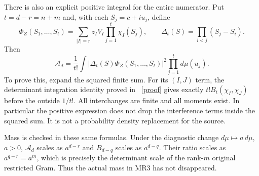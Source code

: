 \documentclass[11pt]{article}
\begin{document}
There is also an explicit positive integral for the entire numerator.
Put $t=d-r=n+m$ and, with each $S_j=c+iu_j$, define
\[
 \Phi_Z(S_1,\ldots,S_t)
    =\sum_{|I|=r}z_IV_I\prod_{j=1}^t\chi_I(S_j),
 \qquad \Delta_t(S)=\prod_{i<j}(S_j-S_i).
\]
Then
\[
 \mathcal A_d=\frac1{t!}\int
      |\Delta_t(S)\Phi_Z(S_1,\ldots,S_t)|^2
                         \prod_{j=1}^t d\mu(u_j).\tag{MR20}
\]
To prove this, expand the squared finite sum. For its $(I,J)$ term,
the determinant integration identity proved in \cite{mrroot:Mixed}%
~\href{https://github.com/KokunoYumeto/zeta-function-research-reader/blob/5992ad50c0f2a06921f1fcaded7b4e38097c0739/workbenches/splitzero-tandem/continuations/20260920-original-kernel-mixed-determinants/MIXED_CONFLUENT_PROOF.tex\#L1}{[proof]}%
{} gives
exactly $t!B_t(\chi_I,\chi_J)$ before the outside $1/t!$.
All interchanges are finite and all moments exist. In particular the
positive expression does not drop the interference terms inside the
squared sum. It is not a probability density replacement for the source.

Mass is checked in these same formulas. Under the diagnostic change
$d\mu\mapsto a\,d\mu$, $a>0$, $\mathcal A_d$ scales as $a^{d-r}$
and $B_{d-q}$ scales as $a^{d-q}$. Their ratio scales as $a^{q-r}=a^m$,
which is precisely the determinant scale of the rank-$m$ original
restricted Gram. Thus the actual mass in MR3 has not disappeared.
\end{document}
